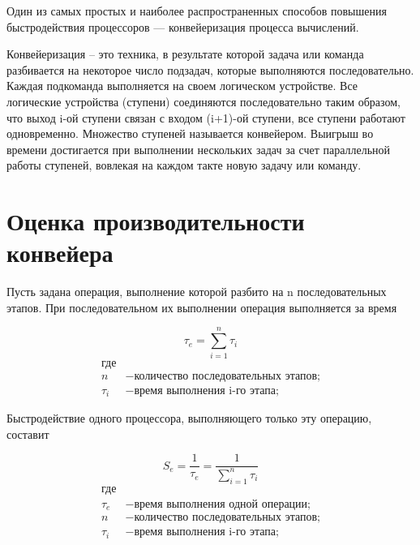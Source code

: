 \documentclass[a4paper,14pt]{report}
\begin{document}
Один из самых простых и наиболее распространенных способов повышения быстродействия процессоров — конвейеризация процесса вычислений.

Конвейеризация – это техника, в результате которой задача или  команда разбивается  на некоторое число подзадач, которые  выполняются последовательно.
Каждая  подкоманда   выполняется на своем логическом  устройстве.
Все логические устройства (ступени) соединяются последовательно таким образом, что выход i-ой  ступени  связан   с   входом   (i+1)-ой   ступени,  все ступени  работают  одновременно.
Множество  ступеней называется конвейером. Выигрыш во времени достигается при выполнении  нескольких задач  за  счет параллельной   работы   ступеней,  вовлекая  на  каждом такте новую задачу или команду.

\section*{Оценка производительности конвейера}

Пусть задана операция, выполнение которой разбито на n последовательных этапов. При последовательном их выполнении операция выполняется за время

\begin{equation}\label{form:way}
 \tau _{e}={\sum\limits_{i=1}^n \tau _{i}}
 \end{equation}
 \begin{align*}
    \text{где} \\
    n &- \text{количество последовательных этапов;} \\
   \tau _{i} &- \text{время выполнения i-го этапа;}
\end{align*}

Быстродействие одного процессора, выполняющего только эту операцию, составит

\begin{equation}\label{form:way}
 S_{e}={\frac{1}{\tau _{e}}}={\frac{1}{\sum\limits_{i=1}^n \tau _{i}}}
 \end{equation}
 \begin{align*}
    \text{где} \\
    \tau _{e} &- \text{время выполнения одной операции;} \\
    n &- \text{количество последовательных этапов;} \\
   \tau _{i} &- \text{время выполнения i-го этапа;}
\end{align*}
\end{document}

